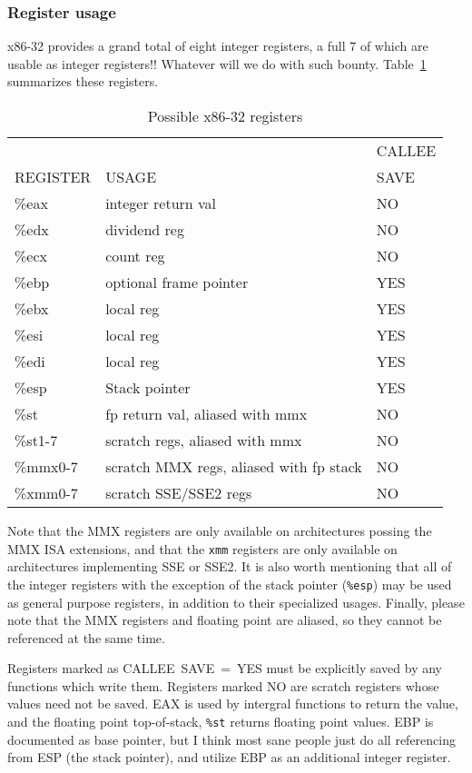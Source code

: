 \documentclass[11pt]{article}
\begin{document}
\subsubsection{Register usage}
x86-32 provides a grand total of eight integer registers, a full 7 of which
are usable as integer registers!!  Whatever will we do with such bounty.
Table~\ref{tab-x86-32-regs} summarizes these registers.
\begin{table}[htb]
\begin{center}
\begin{tabular}{||l|l|l||}\hline\hline
         &       & CALLEE\\
REGISTER & USAGE & SAVE\\\hline\hline
\%eax    & integer return val & NO\\\hline
\%edx    & dividend reg  & NO\\\hline
\%ecx    & count reg     & NO\\\hline
\%ebp    & optional frame pointer& YES\\\hline
\%ebx    & local reg             & YES\\\hline
\%esi    & local reg             & YES\\\hline
\%edi    & local reg             & YES\\\hline
\%esp    & Stack pointer         & YES\\\hline\hline
\%st     & fp return val, aliased with mmx         & NO\\\hline
\%st1-7  & scratch regs, aliased with mmx & NO\\\hline\hline
\%mmx0-7 & scratch MMX regs, aliased with fp stack & NO\\\hline\hline
\%xmm0-7 & scratch SSE/SSE2 regs & NO\\\hline\hline
\end{tabular}
\end{center}
\caption{Possible x86-32 registers\label{tab-x86-32-regs}}
\end{table}
Note that the MMX registers are only available on architectures possing
the MMX ISA extensions, and that the {\tt xmm} registers are only available
on architectures implementing SSE or SSE2.  It is also worth mentioning that
all of the integer registers with the exception of the stack pointer 
({\tt \%esp}) may be used as general purpose registers, in addition to their
specialized usages.  Finally, please note that the MMX registers
and floating point are aliased, so they cannot be referenced at the same time.


Registers marked as CALLEE~SAVE~=~YES must be explicitly saved by any
functions which write them.  Registers marked NO are scratch registers
whose values need not be saved.  EAX is used by intergral functions to
return the value, and the floating point top-of-stack, \verb+%st+ returns
floating point values.  EBP is documented as base pointer, but I think
most sane people just do all referencing from ESP (the stack pointer),
and utilize EBP as an additional integer register.
\end{document}
